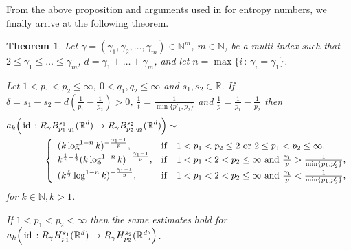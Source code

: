 \documentclass[12pt]{article}
\newtheorem{T}{Theorem}
\def\id{\mathop{\rm id \,}\nolimits}
\newcommand{\Rd}{{\mathbb R}^{d}}
\newcommand{\R}{{\mathbb R}}
\newcommand{\N}{{\mathbb N}}
\begin{document}
From the above proposition  and  arguments used  in \cite{DS} for entropy numbers,  we finally arrive at the following theorem.


\begin{T}\label{mainT2}
	Let $\gamma= (\gamma_1 , \gamma_2, \ldots , \gamma_m)\in \N^m$, $m\in \N$,   be a multi-index such that $2\le \gamma_1\le \ldots \le \gamma_m$, %
	$d= \gamma_1+ \ldots + \gamma_m$, and let $n = \max\{ i\,:\, \gamma_i=\gamma_1\}$.	
	
	Let $1 < p_1<p_2 \leq \infty$,   $0<q_1,q_2\le \infty$ and  $s_1,s_2\in \R$.  If  $\delta=s_1-s_2-d(\frac{1}{p_1}-\frac{1}{p_2})>0$, $\frac{1}{t}=\frac{1}{\min\{p'_1,p_2\}}$  and $\frac{1}{p}=\frac{1}{p_1}-\frac{1}{p_2}$ then 
	\begin{align*}
	& a_k\Big( \id: R_{\gamma} B^{s_1}_{p_1,q_1}(\Rd)\rightarrow R_{\gamma} B^{s_2}_{p_2,q_2}(\Rd)\Big) \sim  \\  
	&\qquad\qquad 	\left\{ \begin{array}{ll} (k\log^{1-n} k)^{-\frac{\gamma_{1}-1}{p}}, &{\mathrm{if}\quad 1< p_1< p_2\leq2\ \mathrm{or}\ 2\leq p_1<p_2\leq\infty,}\\   k^{\frac{1}{t}-\frac{1}{2}}(k\log^{1-n} k)^{-\frac{\gamma_{1}-1}{p}}, &{\mathrm{if}\quad 1< p_1<2< p_2 \leq\infty \ \mathrm{and}\ 	\frac{\gamma_1}{p} > \frac{1}{\min\{p_1,p'_2\}},}\\
			(k^{\frac{t}{2}}\log^{1-n} k)^{-\frac{\gamma_{1}-1}{p}}, &{\mathrm{if}\quad 1< p_1<2< p_2 \leq\infty \ \mathrm{and}\ 	\frac{\gamma_1}{p} < \frac{1}{\min\{p_1,p'_2\}},} \end{array}\right.
		\end{align*}
		for $k\in\N, k>1$.
		
	   If $1 < p_1<p_2 < \infty$  then the same estimates hold for $	a_k\Big( \id: R_{\gamma} H^{s_1}_{p_1}(\Rd)\rightarrow R_{\gamma} H^{s_2}_{p_2}(\Rd)\Big) $. 	
\end{T}
\end{document}
